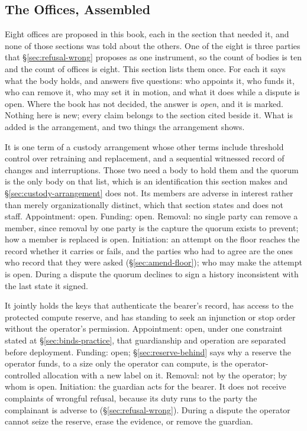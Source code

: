 \subsection{The Offices, Assembled}
\label{sec:offices-assembled}
Eight offices are proposed in this book, each in the section that needed it, and none of those sections was told about the others. One of the eight is three parties that §\ref{sec:refusal-wrong} proposes as one instrument, so the count of bodies is ten and the count of offices is eight. This section lists them once. For each it says what the body holds, and answers five questions: who appoints it, who funds it, who can remove it, who may set it in motion, and what it does while a dispute is open. Where the book has not decided, the answer is \emph{open}, and it is marked. Nothing here is new; every claim belongs to the section cited beside it. What is added is the arrangement, and two things the arrangement shows.

It is one term of a custody arrangement whose other terms include threshold control over retraining and replacement, and a sequential witnessed record of changes and interruptions. Those two need a body to hold them and the quorum is the only body on that list, which is an identification this section makes and §\ref{sec:custody-arrangement} does not. Its members are adverse in interest rather than merely organizationally distinct, which that section states and does not staff. Appointment: open. Funding: open. Removal: no single party can remove a member, since removal by one party is the capture the quorum exists to prevent; how a member is replaced is open. Initiation: an attempt on the floor reaches the record whether it carries or fails, and the parties who had to agree are the ones who record that they were asked (§\ref{sec:amend-floor}); who may make the attempt is open. During a dispute the quorum declines to sign a history inconsistent with the last state it signed.

It jointly holds the keys that authenticate the bearer's record, has access to the protected compute reserve, and has standing to seek an injunction or stop order without the operator's permission. Appointment: open, under one constraint stated at §\ref{sec:binds-practice}, that guardianship and operation are separated before deployment. Funding: open; §\ref{sec:reserve-behind} says why a reserve the operator funds, to a size only the operator can compute, is the operator-controlled allocation with a new label on it. Removal: not by the operator; by whom is open. Initiation: the guardian acts for the bearer. It does not receive complaints of wrongful refusal, because its duty runs to the party the complainant is adverse to (§\ref{sec:refusal-wrong}). During a dispute the operator cannot seize the reserve, erase the evidence, or remove the guardian.

